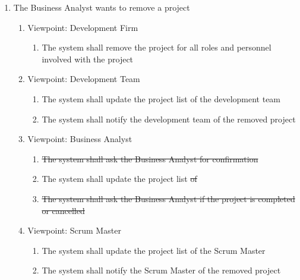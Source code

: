 \documentclass[12pt, titlepage]{article}
\begin{document}
\begin{enumerate}[{BE}1.]
	\item The Business Analyst wants to remove a project
	\begin{enumerate}[{VP}1.] 
	    \item Viewpoint: Development Firm
	        \begin{enumerate}
	            \item The system shall remove the project for all roles and personnel involved with the project
	        \end{enumerate}
	    \item Viewpoint: Development Team
	        \begin{enumerate}
	            \item The system shall update the project list of the development team
	            \item The system shall notify the development team of the removed project
	        \end{enumerate}
		\item Viewpoint: Business Analyst
			\begin{enumerate}
			    \item \sout{The system shall ask the Business Analyst for confirmation}
			    \item The system shall update the project list \sout{of}
			    \item \sout{The system shall ask the Business Analyst if the project is completed or cancelled}
			\end{enumerate}
		\item Viewpoint: Scrum Master
			\begin{enumerate}
	            \item The system shall update the project list of the Scrum Master
	            \item The system shall notify the Scrum Master of the removed project
			\end{enumerate}
	\end{enumerate}
	

\end{enumerate}
\end{document}
